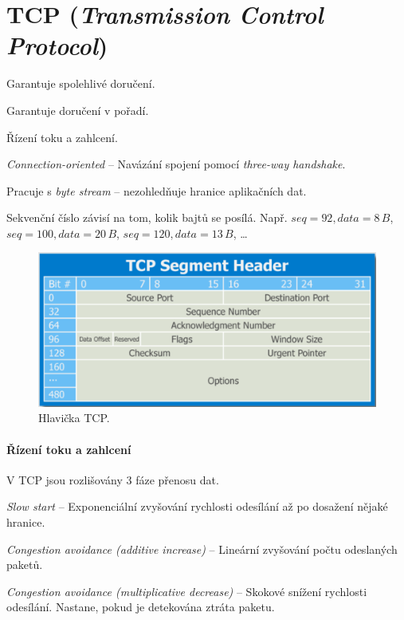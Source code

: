 
\section{TCP (\textit{Transmission Control Protocol})}

\begin{compactitem}
    \item Garantuje spolehlivé doručení.
    \item Garantuje doručení v pořadí.
    \item Řízení toku a zahlcení.
    \item \textit{Connection-oriented} -- Navázání spojení pomocí \textit{three-way handshake}.
    \item Pracuje s \textit{byte stream} -- nezohledňuje hranice aplikačních dat.
    \item Sekvenční číslo závisí na tom, kolik bajtů se posílá. Např. $seq=92, data=8\,B$, $seq=100, data=20\,B$, $seq=120, data=13\,B$, \dots
\end{compactitem}

\begin{figure}[H]
    \centering
    \includegraphics[width=0.75\linewidth]{tcp_header.png}
    \caption{Hlavička TCP.}
\end{figure}

\paragraph*{Řízení toku a zahlcení} V TCP jsou rozlišovány 3 fáze přenosu dat. \begin{compactitem}
    \item \textit{Slow start} -- Exponenciální zvyšování rychlosti odesílání až po dosažení nějaké hranice.
    \item \textit{Congestion avoidance (additive increase)} -- Lineární zvyšování počtu odeslaných paketů.
    \item \textit{Congestion avoidance (multiplicative decrease)} -- Skokové snížení rychlosti odesílání. Nastane, pokud je detekována ztráta paketu.
\end{compactitem}

